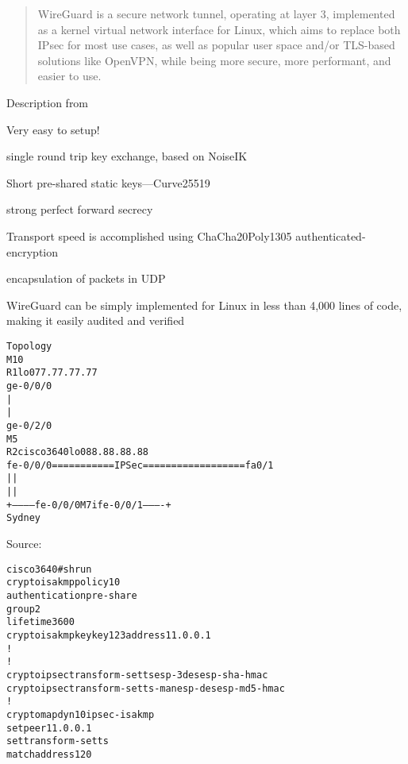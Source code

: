 \documentclass[Screen16to9,17pt]{foils}
\begin{document}
\begin{quote}\small
WireGuard is a secure network tunnel, operating at layer 3, implemented as a kernel virtual network interface for Linux, which aims to replace both IPsec for most use cases, as well as popular user space and/or TLS-based solutions like OpenVPN, while being more secure, more performant, and easier to use.
\end{quote}

Description from 

\begin{list2}
\item Very easy to setup!
\item single round trip key exchange, based on NoiseIK
\item Short pre-shared static keys—Curve25519
\item strong perfect forward secrecy
\item Transport
speed is accomplished using ChaCha20Poly1305 authenticated-encryption
\item encapsulation of packets in UDP
\item WireGuard can be
simply implemented for Linux in less than 4,000 lines of code, making it easily audited and verified
\end{list2}



\begin{alltt}\small
Topology
  M10
  R1      lo0 77.77.77.77
ge-0/0/0
   |
   |
ge-0/2/0
  M5
  R2                                         cisco3640  lo0 88.88.88.88
fe-0/0/0  ===========IPSec==================    fa0/1
   |                                              |
   |                                              |
   +----------- fe-0/0/0  M7i  fe-0/0/1 ----------+
                        Sydney
\end{alltt}

Source:


\begin{alltt}\small
cisco3640#sh run
crypto isakmp policy 10
 authentication pre-share
 group 2
 lifetime 3600
crypto isakmp key key123 address 11.0.0.1
!
!
crypto ipsec transform-set ts esp-3des esp-sha-hmac
crypto ipsec transform-set ts-man esp-des esp-md5-hmac
!
crypto map dyn 10 ipsec-isakmp
 set peer 11.0.0.1
 set transform-set ts
 match address 120
\end{alltt}
\end{document}
